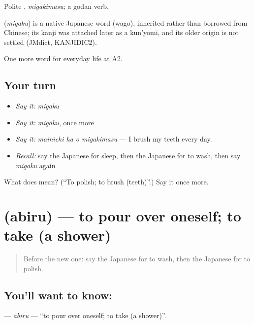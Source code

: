Polite \textbf{}, \emph{migakimasu}; a godan verb.

\begin{cousinweb}
\textbf{} (\emph{migaku}) is a native Japanese word (wago), inherited rather than borrowed from Chinese; its kanji was attached later as a kun'yomi, and its older origin is not settled (JMdict, KANJIDIC2).
\end{cousinweb}

\begin{grammarlens}[title={What you've built}]
One more word for everyday life at A2.
\end{grammarlens}

\subsection*{Your turn}
\begin{itemize}
\raggedright
  \item \emph{Say it:} \emph{migaku}
  \item \emph{Say it:} \emph{migaku}, once more
  \item \emph{Say it:} \emph{mainichi ha o migakimasu} — I brush my teeth every day.
  \item \emph{Recall:} say the Japanese for sleep, then the Japanese for to wash, then say \emph{migaku} again
\end{itemize}

\begin{tcolorbox}[breakable,colback=teal!4,colframe=teal!35!black,title={Before you move on}]
What does  mean? (\textquotedblleft{}To polish; to brush (teeth)\textquotedblright{}.) Say it once more.
\end{tcolorbox}
\section[\texorpdfstring{\ja{あびる} (abiru)}{あびる (abiru)}]{ (abiru) — to pour over oneself; to take (a shower)}

\label{lesson:JA-C147-abiru}



\begin{quote}
Before the new one: say the Japanese for to wash, then the Japanese for to polish.
\end{quote}

\subsection*{You'll want to know: }
\textbf{} — \emph{abiru} — \textquotedblleft{}to pour over oneself; to take (a shower)\textquotedblright{}.

